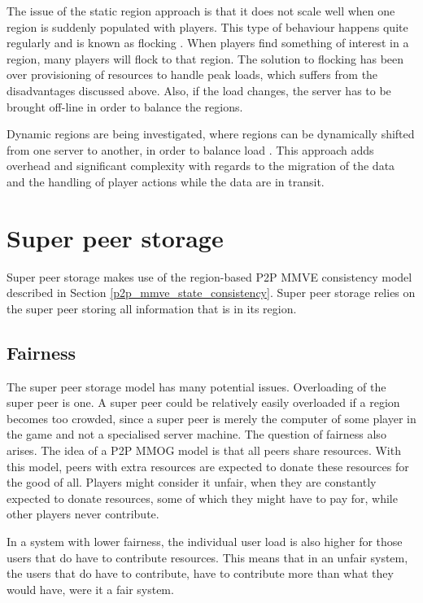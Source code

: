 The issue of the static region approach is that it does not scale well when one region is suddenly populated with players. This type of behaviour
happens quite regularly and is known as flocking \cite{flocking}. When players find something of interest in a region, many players will flock to
that region. The solution to flocking has been over provisioning of resources to handle peak loads, which suffers from the disadvantages discussed above. Also, if the load changes, the server has to be brought off-line in order to balance the regions.

Dynamic regions are being investigated, where regions can be dynamically shifted from one server to another, in order to balance load
\cite{zone_based_dyn}. This approach adds overhead and significant complexity with regards to the migration of the data and the handling of player actions while the data are in transit.

\section{Super peer storage}
\label{super_peer_storage}

Super peer storage makes use of the region-based P2P MMVE consistency model described in Section \ref{p2p_mmve_state_consistency}. Super peer storage relies on the super peer storing all information that is in its region.

\subsection{Fairness}
The super peer storage model has many potential issues. Overloading of the super peer is one. A super peer could be relatively easily overloaded if a
region becomes too crowded, since a super peer is merely the computer of some player in the game and not a specialised server machine. The question
of fairness also arises. The idea of a P2P MMOG model is that all peers share resources. With this model, peers with extra resources are expected to
donate these resources for the good of all. Players might consider it unfair, when they are constantly expected to donate resources, some of which
they might have to pay for, while other players never contribute.

In a system with lower fairness, the individual user load is also higher for those users that do have to contribute resources. This means that in an
unfair system, the users that do have to contribute, have to contribute more than what they would have, were it a fair system.

